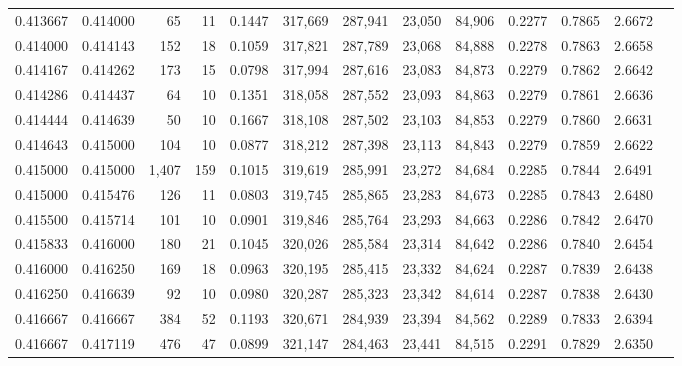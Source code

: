 \begin{tabular}{rrrrrrrrrrrrr}
0.413667 & 0.414000 &    65 &  11 &                                     0.1447 & 317,669 & 287,941 &  23,050 &  84,906 & 0.2277 & 0.7865 & 2.6672 \\
0.414000 & 0.414143 &   152 &  18 &                                     0.1059 & 317,821 & 287,789 &  23,068 &  84,888 & 0.2278 & 0.7863 & 2.6658 \\
0.414167 & 0.414262 &   173 &  15 &                                     0.0798 & 317,994 & 287,616 &  23,083 &  84,873 & 0.2279 & 0.7862 & 2.6642 \\
0.414286 & 0.414437 &    64 &  10 &                                     0.1351 & 318,058 & 287,552 &  23,093 &  84,863 & 0.2279 & 0.7861 & 2.6636 \\
0.414444 & 0.414639 &    50 &  10 &                                     0.1667 & 318,108 & 287,502 &  23,103 &  84,853 & 0.2279 & 0.7860 & 2.6631 \\
0.414643 & 0.415000 &   104 &  10 &                                     0.0877 & 318,212 & 287,398 &  23,113 &  84,843 & 0.2279 & 0.7859 & 2.6622 \\
0.415000 & 0.415000 & 1,407 & 159 &                                     0.1015 & 319,619 & 285,991 &  23,272 &  84,684 & 0.2285 & 0.7844 & 2.6491 \\
0.415000 & 0.415476 &   126 &  11 &                                     0.0803 & 319,745 & 285,865 &  23,283 &  84,673 & 0.2285 & 0.7843 & 2.6480 \\
0.415500 & 0.415714 &   101 &  10 &                                     0.0901 & 319,846 & 285,764 &  23,293 &  84,663 & 0.2286 & 0.7842 & 2.6470 \\
0.415833 & 0.416000 &   180 &  21 &                                     0.1045 & 320,026 & 285,584 &  23,314 &  84,642 & 0.2286 & 0.7840 & 2.6454 \\
0.416000 & 0.416250 &   169 &  18 &                                     0.0963 & 320,195 & 285,415 &  23,332 &  84,624 & 0.2287 & 0.7839 & 2.6438 \\
0.416250 & 0.416639 &    92 &  10 &                                     0.0980 & 320,287 & 285,323 &  23,342 &  84,614 & 0.2287 & 0.7838 & 2.6430 \\
0.416667 & 0.416667 &   384 &  52 &                                     0.1193 & 320,671 & 284,939 &  23,394 &  84,562 & 0.2289 & 0.7833 & 2.6394 \\
0.416667 & 0.417119 &   476 &  47 &                                     0.0899 & 321,147 & 284,463 &  23,441 &  84,515 & 0.2291 & 0.7829 & 2.6350 \\

\end{tabular}
